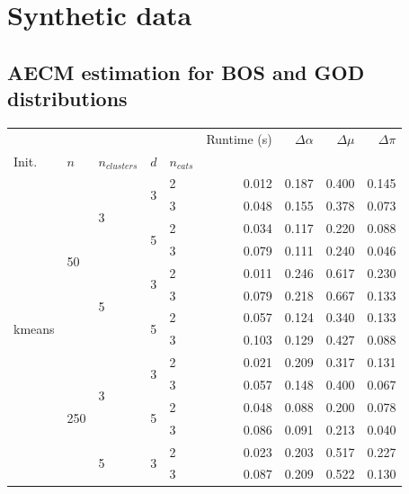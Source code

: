 \section{Synthetic data}
\label{appendix:metrics_synth}

\subsection*{AECM estimation for BOS and GOD distributions}
\begin{table}[H]
\centering
\begin{minipage}{.48\columnwidth}
\begin{adjustbox}{width=\columnwidth}
\begin{tabular}{lllllrrrr}
\toprule
 &  &  &  &  & Runtime (s) & $\Delta \alpha$ & $\Delta \mu$ & $\Delta \pi$ \\
Init. & $n$ & $n_{clusters}$ & $d$ & $n_{cats}$ &  &  &  &  \\
\midrule
\multirow[t]{16}{*}{kmeans} & \multirow[t]{8}{*}{50} & \multirow[t]{4}{*}{3} & \multirow[t]{2}{*}{3} & 2 & 0.012 & 0.187 & 0.400 & 0.145 \\
 &  &  &  & 3 & 0.048 & 0.155 & 0.378 & 0.073 \\
\cline{4-9}
 &  &  & \multirow[t]{2}{*}{5} & 2 & 0.034 & 0.117 & 0.220 & 0.088 \\
 &  &  &  & 3 & 0.079 & 0.111 & 0.240 & 0.046 \\
\cline{3-9} \cline{4-9}
 &  & \multirow[t]{4}{*}{5} & \multirow[t]{2}{*}{3} & 2 & 0.011 & 0.246 & 0.617 & 0.230 \\
 &  &  &  & 3 & 0.079 & 0.218 & 0.667 & 0.133 \\
\cline{4-9}
 &  &  & \multirow[t]{2}{*}{5} & 2 & 0.057 & 0.124 & 0.340 & 0.133 \\
 &  &  &  & 3 & 0.103 & 0.129 & 0.427 & 0.088 \\
\cline{2-9} \cline{3-9} \cline{4-9}
 & \multirow[t]{8}{*}{250} & \multirow[t]{4}{*}{3} & \multirow[t]{2}{*}{3} & 2 & 0.021 & 0.209 & 0.317 & 0.131 \\
 &  &  &  & 3 & 0.057 & 0.148 & 0.400 & 0.067 \\
\cline{4-9}
 &  &  & \multirow[t]{2}{*}{5} & 2 & 0.048 & 0.088 & 0.200 & 0.078 \\
 &  &  &  & 3 & 0.086 & 0.091 & 0.213 & 0.040 \\
\cline{3-9} \cline{4-9}
 &  & \multirow[t]{4}{*}{5} & \multirow[t]{2}{*}{3} & 2 & 0.023 & 0.203 & 0.517 & 0.227 \\
 &  &  &  & 3 & 0.087 & 0.209 & 0.522 & 0.130 \\

\end{tabular}
\end{adjustbox}
\end{minipage}
\end{table}
